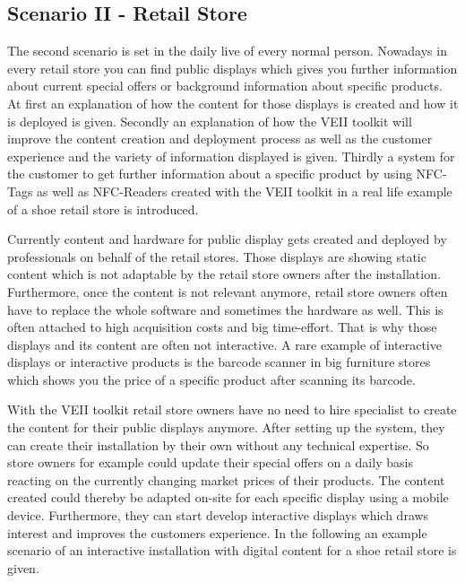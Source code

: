 \subsection{Scenario II - Retail Store}
The second scenario is set in the daily live of every normal person. Nowadays in every retail store you can find public displays which gives you further information about current special offers or background information about specific products. At first an explanation of how the content for those displays is created and how it is deployed is given. Secondly an explanation of how the VEII toolkit will improve the content creation and deployment process as well as the customer experience and the variety of information displayed is given. Thirdly a system for the customer to get further information about a specific product by using NFC-Tags as well as NFC-Readers created with the VEII toolkit in a real life example of a shoe retail store is introduced.

Currently content and hardware for public display gets created and deployed by professionals on behalf of the retail stores. Those displays are showing static content which is not adaptable by the retail store owners after the installation. Furthermore, once the content is not relevant anymore, retail store owners often have to replace the whole software and sometimes the hardware as well. This is often attached to high acquisition costs and big time-effort. That is why those displays and its content are often not interactive. A rare example of interactive displays or interactive products is the barcode scanner in big furniture stores which shows you the price of a specific product after scanning its barcode.

With the VEII toolkit retail store owners have no need to hire specialist to create the content for their public displays anymore. After setting up the system, they can create their installation by their own without any technical expertise. So store owners for example could update their special offers on a daily basis reacting on the currently changing market prices of their products. The content created could thereby be adapted on-site for each specific display using a mobile device. Furthermore, they can start develop interactive displays which draws interest and improves the customers experience. In the following an example scenario of an interactive installation with digital content for a shoe retail store is given.

